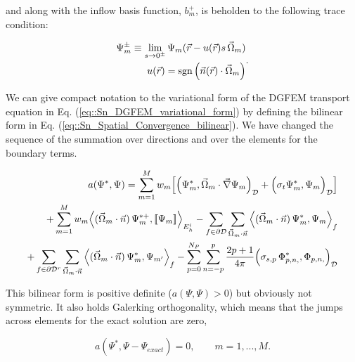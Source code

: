 \noindent and along with the inflow basis function, $b_m^{+}$, is beholden to the following trace condition:

\begin{equation}
\label{eq::Sn_Spatial_Convergence_trace}
\begin{aligned}
\Psi_m^{\pm} \equiv \lim\displaylimits_{s \rightarrow 0^\pm} \Psi_m (\vec{r} - u (\vec{r})  s  \, \vec{\Omega}_m ) \\
u (\vec{r}) = \text{sgn} \left(  \vec{n} (\vec{r}) \cdot  \vec{\Omega}_m \right)
\end{aligned} .
\end{equation}

We can give compact notation to the variational form of the DGFEM transport equation in Eq. (\ref{eq::Sn_DGFEM_variational_form}) by defining the bilinear form in Eq. (\ref{eq::Sn_Spatial_Convergence_bilinear}). We have changed the sequence of the summation over directions and over the elements for the boundary terms.

\begin{equation}
\label{eq::Sn_Spatial_Convergence_bilinear}
\begin{aligned}
a(\Psi^{*},\Psi) = \sum\displaylimits_{m=1}^M w_m \Big[  \Big(  \Psi_m^{*}, \vec{\Omega}_m \cdot   \vec{\nabla} \Psi_{m} \Big)_{\mathcal{D}} + \Big( \sigma_t  \Psi_m^{*},  \Psi_{m} \Big)_{\mathcal{D}}  \Big]  \\
+ \sum\displaylimits_{m=1}^M w_m \Big< ( \vec{\Omega}_m \cdot \vec{n} ) \, \Psi_m^{* +}, [\![ \Psi_m]\!]  \Big>_{E_h^i} - \sum\displaylimits_{f \in \partial \mathcal{D}} \sum\displaylimits_{\vec{\Omega}_m \cdot \vec{n}} \Big< ( \vec{\Omega}_m \cdot \vec{n} ) \, \Psi_m^{*}, {\Psi}_m  \Big>_{f}  \\
+ \sum\displaylimits_{f \in \partial \mathcal{D}^r} \sum\displaylimits_{\vec{\Omega}_m \cdot \vec{n}} \Big< ( \vec{\Omega}_m \cdot \vec{n} ) \, \Psi_m^{*}, {\Psi}_{m'}  \Big>_{f} -      \sum_{p=0}^{N_P} \sum_{n=-p}^{p} \frac{2p + 1}{4 \pi}   \Big(  \sigma_{s,p} \,  \Phi_{p,n,}^{*},  \Phi_{p,n,} \Big)_{\mathcal{D}} 
\end{aligned}
\end{equation}

\noindent This bilinear form is positive definite ($a(\Psi,\Psi) > 0$) but obviously not symmetric. It also holds Galerking orthogonality, which means that the jumps across elements for the exact solution are zero,

\begin{equation}
\label{eq::Sn_Spatial_Convergence_Galerkin_orth}
a(\Psi^{*},\Psi - \Psi_{exact})  = 0, \qquad m=1,...,M .
\end{equation}

